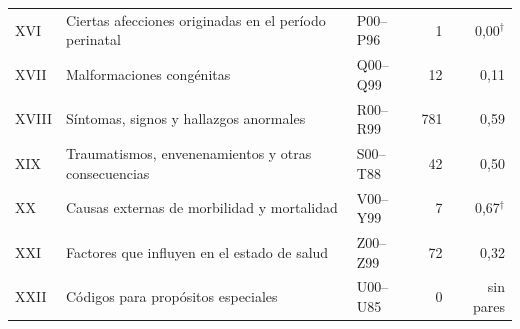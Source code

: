 {\begin{longtable}{lP{6.6cm}lrr}
XVI & Ciertas afecciones originadas en el período perinatal & P00--P96 & 1 & 0,00$^{\dagger}$ \\
XVII & Malformaciones congénitas & Q00--Q99 & 12 & 0,11 \\
XVIII & Síntomas, signos y hallazgos anormales & R00--R99 & 781 & 0,59 \\
XIX & Traumatismos, envenenamientos y otras consecuencias & S00--T88 & 42 & 0,50 \\
XX & Causas externas de morbilidad y mortalidad & V00--Y99 & 7 & 0,67$^{\dagger}$ \\
XXI & Factores que influyen en el estado de salud & Z00--Z99 & 72 & 0,32 \\
XXII & Códigos para propósitos especiales & U00--U85 & 0 & sin pares \\
\hline
\end{longtable}
}
